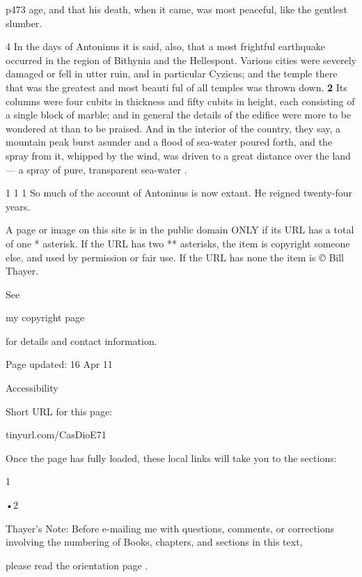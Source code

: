 p473 age, and that his death, when it came, was most peaceful, like the gentlest slumber.

4 In the days of Antoninus it is said, also, that a most frightful earthquake occurred in the region of Bithynia and the Hellespont. Various cities were severely damaged or fell in utter ruin, and in particular Cyzicus; and the temple there that was the greatest and most beauti ­ful of all temples was thrown down. \textbf{2} Its columns were four cubits in thickness and fifty cubits in height, each consisting of a single block of marble; and in general the details of the edifice were more to be wondered at than to be praised. And in the interior of the country, they say, a mountain peak burst asunder and a flood of sea-water poured forth, and the spray from it, whipped by the wind, was driven to a great distance over the land \texthebrew{—} a spray of pure, transparent sea-water .


1
1 1 So much of the account of Antoninus is now extant. He reigned twenty-four years.

A page or image on this site is in the public domain ONLY if its URL has a total of one * asterisk. If the URL has two ** asterisks, the item is copyright someone else, and used by permission or fair use. If the URL has none the item is \emph{©} Bill Thayer.

See

my copyright page

for details and contact information.

Page updated:
16 Apr 11

Accessibility


Short URL for this page:

tinyurl.com/CasDioE71

Once the page has fully loaded, these local links will take you to the sections:

1

\texthebrew{•}2

Thayer's Note: Before e-mailing me with questions, comments, or corrections involving the numbering of Books, chapters, and sections in this text,

please read the orientation page .

